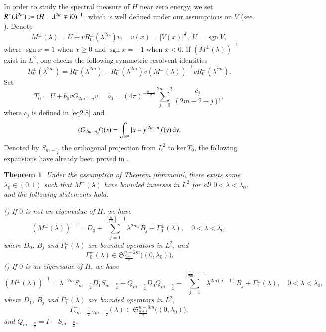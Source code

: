 \documentclass[11pt,reqno]{amsart}
\def\R {\mathbb{R}}
\def\d{{\rm d}}
\def\i{{\rm i}}
\DeclareMathOperator{\sgn}{\text{sgn}}
\newtheorem{theorem}{Theorem}[section]
\numberwithin{equation}{section}
\theoremstyle{definition}
\begin{document}
In order to study the spectral measure of $H$ near zero energy, we set $R^\pm(\lambda^{2m}):=(H-\lambda^{2m}\mp \i0)^{-1}$, which is well defined under our assumptions on $V$ (see \cite{AH}). Denote
\begin{equation*}\label{equ3.1}
	M^{\pm}(\lambda)=U+vR_0^\pm(\lambda^{2m})v,\quad v(x)=|V(x)|^{\frac12}, \,\,U=\sgn V,
\end{equation*}
where $\sgn x=1$ when $x\ge 0$ and $\sgn x=-1$ when $x< 0$. If $(M^\pm(\lambda))^{-1}$ exist in $L^2$, one checks the following symmetric resolvent identities
\begin{equation}\label{equ3.2}
	R_V^{\pm}(\lambda^{2m})=R_0^\pm(\lambda^{2m})-R_0^\pm(\lambda^{2m})v(M^\pm(\lambda))^{-1}vR_0^\pm(\lambda^{2m}).
\end{equation}
Set
\begin{equation*}\label{equ3.5}
	T_0=U+b_0vG_{2m-n}v,\quad b_0=(4\pi)^{-\frac{n-1}{2}}\sum_{j=0}^{2m-2}\frac{c_j}{(2m-2-j)!},
\end{equation*}
where $c_j$ is defined in \eqref{eq2.8} and
\begin{equation*}\label{equ3.3}
	(G_{2m-n}f)(x)=\int_{\R^n}|x-y|^{2m-n}f(y)\,\d y.
\end{equation*}
Denoted by $S_{m-\frac{n}{2}}$ the orthogonal projection from $L^2$ to $\mbox{ker}\,T_0$, the following expansions have already been proved in \cite{FSWY}.



\begin{theorem}\label{thm3.4}
	Under the assumption of Theorem \ref{thmmain}, there exists some $\lambda_0\in(0,1)$ such that $M^\pm(\lambda)$ have bounded inverses in $L^2$ for all $0<\lambda<\lambda_0$, and the following statements hold.
	
	\noindent() If $0$ is not an eigenvalue of $H$, we have
	\begin{equation*}\label{equ3.48}
		(M^\pm(\lambda))^{-1}=
		D_0+\sum\limits_{j=1 }^{[\frac{n}{2m}]-1}\lambda^{2mj}B_j+\Gamma_{0}^\pm(\lambda),\quad0<\lambda<\lambda_0,
	\end{equation*}
	where $D_0$, $B_j$ and $\Gamma_{0}^\pm(\lambda)$ are bounded operators in $L^2$, and
	\begin{equation*}\label{equ3.47.1-000}
		\Gamma_{0}^\pm(\lambda)\in \mathfrak{S}^{n-2m}_{\frac{n+1}{2}}\big((0,\lambda_0)\big).
	\end{equation*}
	\noindent()  If $0$ is an eigenvalue of $H$, we have
	\begin{equation*}\label{equ3.48-222}
		(M^\pm(\lambda))^{-1}=
		\lambda^{-2m}S_{m-\frac{n}{2}}D_1S_{m-\frac{n}{2}}+Q_{m-\frac{n}{2}}D_0Q_{m-\frac{n}{2}}+\sum\limits_{j=1 }^{[\frac{n}{2m}]-1}\lambda^{2m(j-1)}B_j+\Gamma_{1}^\pm(\lambda),\quad0<\lambda<\lambda_0,
	\end{equation*}
	where $D_1$, $B_j$ and $\Gamma_{1}^\pm(\lambda)$ are bounded operators in $L^2$,
	\begin{equation*}\label{equ3.47.1}
		\Gamma_{ 2m-\frac{n}{2},  2m-\frac{n}{2}}^\pm(\lambda)\in \mathfrak{S}^{n-6m}_{\frac{n+1}{2}}\big((0,\lambda_0)\big),
	\end{equation*}
	and $Q_{m-\frac{n}{2}}=I-S_{m-\frac{n}{2}}$.
\end{theorem}
\end{document}
